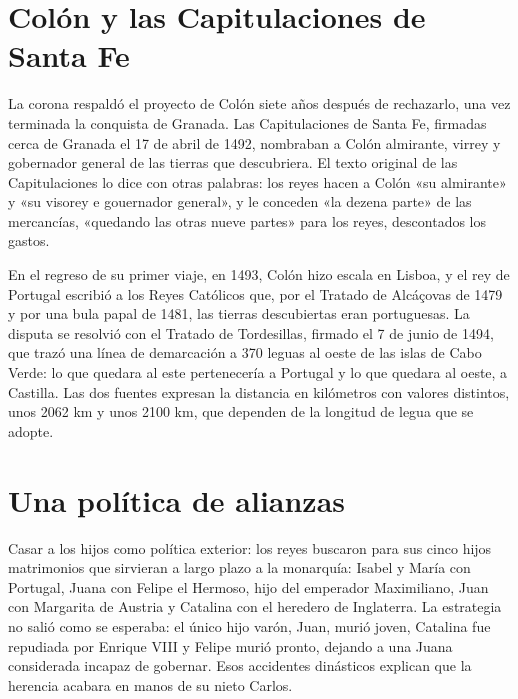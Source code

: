 \documentclass{book}
\begin{document}

\section{Colón y las Capitulaciones de Santa Fe}

La corona respaldó el proyecto de Colón siete años después de rechazarlo, una vez terminada la conquista de Granada. Las Capitulaciones de Santa Fe, firmadas cerca de Granada el 17 de abril de 1492, nombraban a Colón almirante, virrey y gobernador general de las tierras que descubriera. El texto original de las Capitulaciones lo dice con otras palabras: los reyes hacen a Colón «su almirante» y «su visorey e gouernador general», y le conceden «la dezena parte» de las mercancías, «quedando las otras nueve partes» para los reyes, descontados los gastos.


En el regreso de su primer viaje, en 1493, Colón hizo escala en Lisboa, y el rey de Portugal escribió a los Reyes Católicos que, por el Tratado de Alcáçovas de 1479 y por una bula papal de 1481, las tierras descubiertas eran portuguesas. La disputa se resolvió con el Tratado de Tordesillas, firmado el 7 de junio de 1494, que trazó una línea de demarcación a 370 leguas al oeste de las islas de Cabo Verde: lo que quedara al este pertenecería a Portugal y lo que quedara al oeste, a Castilla. Las dos fuentes expresan la distancia en kilómetros con valores distintos, unos 2062 km y unos 2100 km, que dependen de la longitud de legua que se adopte.


\section{Una política de alianzas}

Casar a los hijos como política exterior: los reyes buscaron para sus cinco hijos matrimonios que sirvieran a largo plazo a la monarquía: Isabel y María con Portugal, Juana con Felipe el Hermoso, hijo del emperador Maximiliano, Juan con Margarita de Austria y Catalina con el heredero de Inglaterra. La estrategia no salió como se esperaba: el único hijo varón, Juan, murió joven, Catalina fue repudiada por Enrique VIII y Felipe murió pronto, dejando a una Juana considerada incapaz de gobernar. Esos accidentes dinásticos explican que la herencia acabara en manos de su nieto Carlos.
\end{document}
